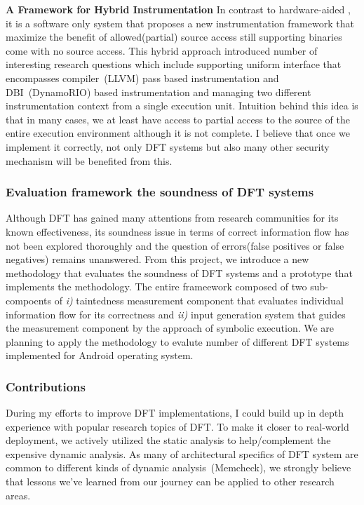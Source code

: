 \documentclass[letterpaper, 10pt]{article}
\begin{document}
\begin{small}
{\bf A Framework for Hybrid Instrumentation} In contrast to hardware-aided \SR,
it is a software only system that proposes a new instrumentation framework that
maximize the benefit of allowed(partial) source access still supporting
binaries come with no source access. 
%
This hybrid approach introduced number of interesting research questions which
include supporting uniform interface that encompasses compiler~(LLVM) pass
based instrumentation and  DBI~(DynamoRIO) based instrumentation and managing
two different instrumentation context from a single execution unit. 
%
Intuition behind this idea is that in many cases, we at least
have access to partial access to the source of the entire execution environment
although it is not complete. I believe that once we implement it correctly, not
only DFT systems but also many other security mechanism will be benefited from
this.

\subsubsection*{Evaluation framework the soundness of DFT systems} 
%
Although DFT has gained many attentions from research communities for its known
effectiveness, its soundness issue in terms of correct information flow has not
been explored thoroughly and the question of errors(false positives or false
negatives) remains unanswered. From this project, we introduce a new
methodology that evaluates the soundness of DFT systems and  a prototype that
implements the methodology.
%
The entire frameework composed of two sub-compoents of {\it i)} taintedness
measurement component that evaluates individual information flow for its
correctness and {\it ii)} input generation system that guides the measurement
component by the approach of symbolic execution.
%
We are planning to apply the methodology to evalute number of different DFT
systems implemented for Android operating system.

\subsubsection*{Contributions}
During my efforts to improve DFT implementations, I could build up in depth
experience with popular research topics of DFT. 
%
To make it closer to real-world deployment, we actively utilized the static
analysis to help/complement the expensive dynamic analysis. 
%
As many of architectural specifics of DFT system are common to different kinds
of dynamic analysis~(\ie Memcheck), we strongly believe that lessons we've
learned from our journey can be applied to other research areas.
 

\end{small}
\end{document}

